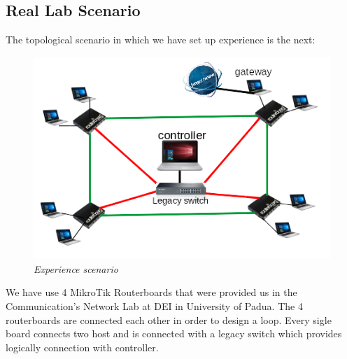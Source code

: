 \documentclass[article,10pt]{IEEEtran}
\begin{document}
\subsection{Real Lab Scenario}
The topological scenario in which we have set up experience is the next:
\begin{figure}[!h]
 \centering
 \includegraphics[scale=0.70]{images/topo.png}
 \caption{\emph{Experience scenario}}
 \label{fig:topo}
\end{figure}

We have use 4 MikroTik Routerboards that were provided us in the Communication's Network Lab at DEI in University of Padua.
The 4 routerboards are connected each other in order to design a loop. Every sigle board connects two host and is connected with a 
legacy switch which provides logically connection with controller.
\end{document}
